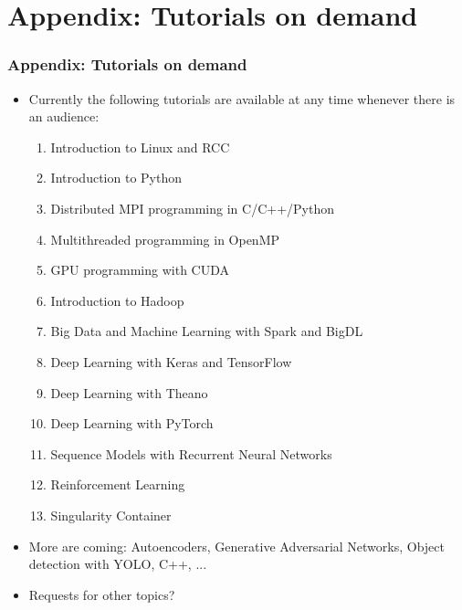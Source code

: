 \section{Appendix: Tutorials on demand}
\begin{frame}[fragile]
  \frametitle{Appendix: Tutorials on demand}
  \begin{itemize}
    \item Currently the following tutorials are available at any time whenever there is an audience:
      \begin{enumerate}
        \item Introduction to Linux and RCC
        \item Introduction to Python
        \item Distributed MPI programming in C/C++/Python
        \item Multithreaded programming in OpenMP
        \item GPU programming with CUDA
        \item Introduction to Hadoop
        \item Big Data and Machine Learning with Spark and BigDL
        \item Deep Learning with Keras and TensorFlow
        \item Deep Learning with Theano
        \item Deep Learning with PyTorch
        \item Sequence Models with Recurrent Neural Networks
        \item Reinforcement Learning
        \item Singularity Container
      \end{enumerate}
    \item More are coming: Autoencoders, Generative Adversarial Networks, Object detection with YOLO, C++, ...
    \item Requests for other topics?
  \end{itemize}
\end{frame}
